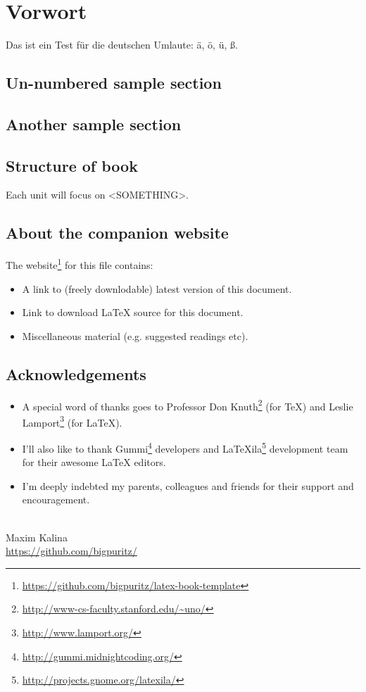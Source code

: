 
\chapter*{Vorwort}
Das ist ein Test für die deutschen Umlaute: ä, ö, ü, ß. \\
\lipsum[1-1]

\section*{Un-numbered sample section}
\lipsum[1-1]

\section*{Another sample section}
\lipsum[1-1]

\section*{Structure of book}
Each unit will focus on <SOMETHING>.

\section*{About the companion website}
The website\footnote{\url{https://github.com/bigpuritz/latex-book-template}} for this file contains:
\begin{itemize}
  \item A link to (freely downlodable) latest version of this document.
  \item Link to download LaTeX source for this document.
  \item Miscellaneous material (e.g. suggested readings etc).
\end{itemize}

\section*{Acknowledgements}
\begin{itemize}
\item A special word of thanks goes to Professor Don Knuth\footnote{\url{http://www-cs-faculty.stanford.edu/~uno/}} (for \TeX{}) and Leslie Lamport\footnote{\url{http://www.lamport.org/}} (for \LaTeX{}).
\item I'll also like to thank Gummi\footnote{\url{http://gummi.midnightcoding.org/}} developers and LaTeXila\footnote{\url{http://projects.gnome.org/latexila/}} development team for their awesome \LaTeX{} editors.
\item I'm deeply indebted my parents, colleagues and friends for their support and encouragement.
\end{itemize}
\mbox{}\\
\noindent Maxim Kalina \\
\noindent \url{https://github.com/bigpuritz/}
